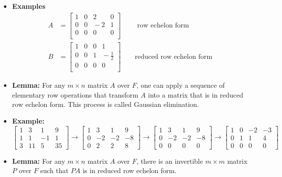 \documentclass[11pt,twoside]{report}
\begin{document}
\begin{itemize}
\item \textbf{Examples} 
\begin{align*}
A &= \begin{bmatrix}
1 & 0 & 2 & 0 \\
0 & 0 & \!\!-2 & 1 \\
0 & 0 & 0 & 0 \\
\end{bmatrix} \qquad \text{ row echelon form} \\
B &= \begin{bmatrix}
1 & 0 & 0 & 1 \\
0 & 0 & 1 & \!\!\!-\frac{1}{2} \\
0 & 0 & 0 & 0 \\
\end{bmatrix} \qquad \text{reduced row echelon form} 
\end{align*}




\item \textbf{Lemma:} For any $m\times n$ matrix $A$ over $F$, one can apply a sequence of elementary row operations that  transform $A$ into a matrix that is in reduced row echelon form. This process is called Gaussian elimination. 

\item \textbf{Example:} 
\[
\begin{bmatrix}1&3&1&9\\1&1&-1&1\\3&11&5&35\end{bmatrix}\to \begin{bmatrix}1&3&1&9\\0&-2&-2&-8\\0&2&2&8\end{bmatrix}\to \begin{bmatrix}1&3&1&9\\0&-2&-2&-8\\0&0&0&0\end{bmatrix}\to \begin{bmatrix}1&0&-2&-3\\0&1&1&4\\0&0&0&0\end{bmatrix}
\]


\item \textbf{Lemma:} For any $m\times n$ matrix $A$ over $F$, there is an invertible $m \times m$ matrix $P$ over $F$ such that $PA$ is in reduced row echelon form.


\end{itemize}
\end{document}
